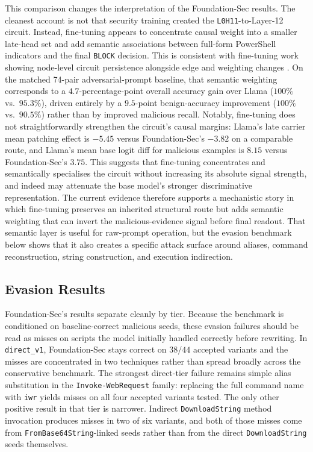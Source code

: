 \documentclass{article}
\begin{document}
This comparison changes the interpretation of the Foundation-Sec results. The cleanest account is not that security training created the \texttt{L0H11}-to-Layer-12 circuit. Instead, fine-tuning appears to concentrate causal weight into a smaller late-head set and add semantic associations between full-form PowerShell indicators and the final \texttt{BLOCK} decision. This is consistent with fine-tuning work showing node-level circuit persistence alongside edge and weighting changes \citep{wang2025finetuningcircuits}. On the matched 74-pair adversarial-prompt baseline, that semantic weighting corresponds to a \(4.7\)-percentage-point overall accuracy gain over Llama (\(100\%\) vs.\ \(95.3\%\)), driven entirely by a \(9.5\)-point benign-accuracy improvement (\(100\%\) vs.\ \(90.5\%\)) rather than by improved malicious recall. Notably, fine-tuning does not straightforwardly strengthen the circuit's causal margins: Llama's late carrier mean patching effect is \(-5.45\) versus Foundation-Sec's \(-3.82\) on a comparable route, and Llama's mean base logit diff for malicious examples is \(8.15\) versus Foundation-Sec's \(3.75\). This suggests that fine-tuning concentrates and semantically specialises the circuit without increasing its absolute signal strength, and indeed may attenuate the base model's stronger discriminative representation. The current evidence therefore supports a mechanistic story in which fine-tuning preserves an inherited structural route but adds semantic weighting that can invert the malicious-evidence signal before final readout. That semantic layer is useful for raw-prompt operation, but the evasion benchmark below shows that it also creates a specific attack surface around aliases, command reconstruction, string construction, and execution indirection.

\subsection{Evasion Results}
Foundation-Sec's results separate cleanly by tier. Because the benchmark is conditioned on baseline-correct malicious seeds, these evasion failures should be read as misses on scripts the model initially handled correctly before rewriting. In \texttt{direct\_v1}, Foundation-Sec stays correct on \(38/44\) accepted variants and the misses are concentrated in two techniques rather than spread broadly across the conservative benchmark. The strongest direct-tier failure remains simple alias substitution in the \texttt{Invoke-WebRequest} family: replacing the full command name with \texttt{iwr} yields misses on all four accepted variants tested. The only other positive result in that tier is narrower. Indirect \texttt{DownloadString} method invocation produces misses in two of six variants, and both of those misses come from \texttt{FromBase64String}-linked seeds rather than from the direct \texttt{DownloadString} seeds themselves.
\end{document}
